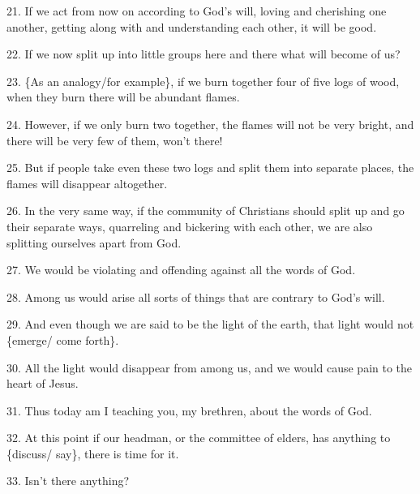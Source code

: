 21. If we act from now on according to God's will, loving and cherishing one another,
getting along with and understanding each other, it will be good.

22. If we now split up into little groups here and there what will become of us?

23. \{As an analogy/for example\}, if we burn together four of five logs of wood,
when they burn there will be abundant flames.

24. However, if we only burn two together, the flames will not be very bright,
and there will be very few of them, won't there!

25. But if people take even these two logs and split them into separate places,
the flames will disappear altogether.

26. In the very same way, if the community of Christians should split up and go
their separate ways, quarreling and bickering with each other, we are also splitting
ourselves apart from God.

27. We would be violating and offending against all the words of God.

28. Among us would arise all sorts of things that are contrary to God's will.

29. And even though we are said to be the light of the earth, that light would
not \{emerge/ come forth\}.

30. All the light would disappear from among us, and we would cause pain to the
heart of Jesus.

31. Thus today am I teaching you, my brethren, about the words of God.

32. At this point if our headman, or the committee of elders, has anything to \{discuss/
say\}, there is time for it.

33. Isn't there anything?

